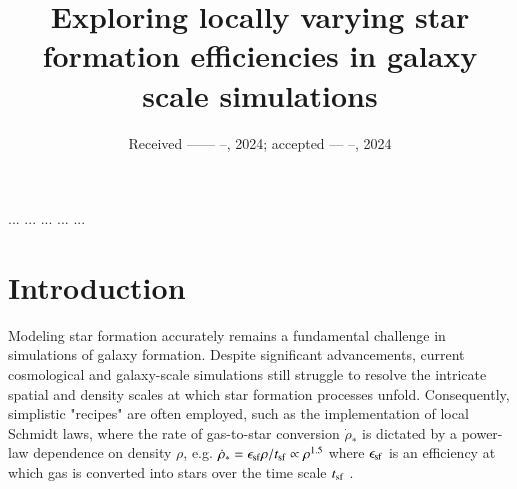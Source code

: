 \documentclass{aa}
\begin{document}
 

   \title{Exploring locally varying star formation efficiencies in galaxy scale simulations}


    \author{}

             

   \date{Received ------ --, 2024; accepted --- --, 2024}

 \abstract
   {...}
   {...}
   {...}
   {...}
   {...}


\maketitle
%

\section{Introduction}

Modeling star formation accurately remains a fundamental challenge in simulations of galaxy formation. Despite significant advancements, current cosmological and galaxy-scale simulations still struggle to resolve the intricate spatial and density scales at which star formation processes unfold. Consequently, simplistic "recipes" are often employed, such as the implementation of local Schmidt laws, where the rate of gas-to-star conversion $\dot{\rho}_{\ast}$ is dictated by a power-law dependence on density $\rho$, e.g. $\dot{\rho}_{\ast}= \epsilon_{\rm sf}\rho/t_{\rm sf} \propto \rho^{1.5}$ where $\epsilon_{\rm sf}$ is an efficiency at which gas is converted into stars over the time scale $t_{\rm sf}$ \citep[e.g.][]{Schmidt_1959}.
\end{document}
